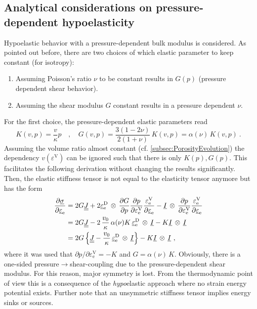 \documentclass[paper=a4, twoside, pagesize]{scrartcl}
\newcommand{\tensor}[1]{\underline{#1}}
\newcommand{\tensorf}[1]{\underline{\underline{#1}}}
\newcommand{\D}{\text{D}}
\newcommand{\e}{\text{e}}
\newcommand{\dyad}{\,\otimes\,}
\begin{document}
\subsection{Analytical considerations on pressure-dependent hypoelasticity}
\label{subsec:AppHypoelasticity}

Hypoelastic behavior with a pressure-dependent bulk modulus is considered. As pointed out before, there are two choices of which elastic parameter to keep constant (for isotropy):
\begin{enumerate}
    \item Assuming Poisson's ratio $\nu$ to be constant results in $G(p)$ (pressure dependent shear behavior).
    \item Assuming the shear modulus $G$ constant results in a pressure dependent $\nu$.
\end{enumerate}
For the first choice, the pressure-dependent elastic parameters read
\begin{equation}
  K(v,p) = \frac{v}{\kappa}p \quad,\quad G(v,p)=\frac{3(1-2\nu)}{2(1+\nu)}\,K(v,p) = \alpha(\nu) \,K(v,p) \ .
\end{equation}
Assuming the volume ratio almost constant (cf. \autoref{subsec:PorosityEvolution}) the dependency $v(\varepsilon^\text{V})$ can be ignored such that there is only $K(p), G(p)$. This facilitates the following derivation without changing the results significantly.
Then, the elastic stiffness tensor is not equal to the elasticity tensor anymore but has the form
\begin{align}
  \frac{\partial \tensor\sigma}{\partial \tensor\varepsilon_\e} &= 2G \tensorf J + 2\tensor\varepsilon_\e^\D \dyad  \frac{\partial G}{\partial p} \frac{\partial p}{\partial \varepsilon_\e^\text{V}} \frac{\varepsilon_\e^\text{V}}{\partial\tensor\varepsilon_\e} - \tensor I \dyad\frac{\partial p}{\partial \varepsilon_\e^\text{V}} \frac{\varepsilon_\e^\text{V}}{\partial\tensor\varepsilon_\e} \\
  &= 
  2G \tensorf J - 2\,\frac{v_0}{\kappa}\,\alpha(\nu) K\, \tensor\varepsilon_\e^\D \dyad \tensor I  - K \tensor I \dyad \tensor I \notag \\
  &= 
  2G \left\{\tensorf J - \frac{v_0}{\kappa}\, \tensor\varepsilon_\e^\D \dyad \tensor I \right\}  - K \tensor I \dyad \tensor I \ ,
\end{align}
where it was used that ${\partial p}/{\partial \varepsilon_\e^\text{V}}=-K$ and $G=\alpha(\nu)\,K$. Obviously, there is a one-sided pressure$\rightarrow$shear-coupling due to the pressure-dependent shear modulus. For this reason, major symmetry is lost. From the thermodynamic point of view this is a consequence of the \emph{hypo}elastic approach where no strain energy potential exists. Further note that an unsymmetric stiffness tensor implies energy sinks or sources.
\end{document}
